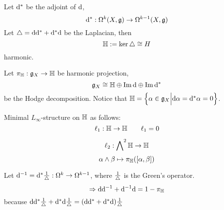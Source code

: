Let $\td^*$ be the adjoint of $\td$,
$$\td^*:\Omg^k(X,\mfkg)\to\Omg^{k-1}(X,\mfkg)$$
Let $\yc=\td\td^*+\td^*\td$ be the Laplacian, then
$$\bbH:=\ker\yc\cong H$$
harmonic.

Let $\pi_\bbH:\mfkg_X\to\bbH$ be harmonic projection,
$$\mfkg_X\cong\bbH\oplus\im\td\oplus\im\td^*$$
be the Hodge decomposition.
Notice that $\bbH=\Bigset{\afa\in\mfkg_X}{\td\afa=\td^*\afa=0}$.

Minimal $L_\infty$-structure on $\bbH$ as follows:
$$\ell_1:\bbH\to\bbH \qquad \ell_1=0$$

$$\ell_2:\wedgeform{2}\bbH\to\bbH$$
$$\afa\wedge\beta\mapsto \pi_\bbH([\afa,\beta])$$

Let $\td^{-1}=\td^*\frac{1}{\yc}:\Omg^k\to\Omg^{k-1}$,
where $\frac{1}{\yc}$ is the Green's operator.
$$\Rightarrow
\td\td^{-1}+\td^{-1}\td=1-\pi_\bbH$$
because
$\td\td^*\frac{1}{\yc}+\td^*\td\frac{1}{\yc}=
(\td\td^*+\td^*\td)\frac{1}{\yc}$




